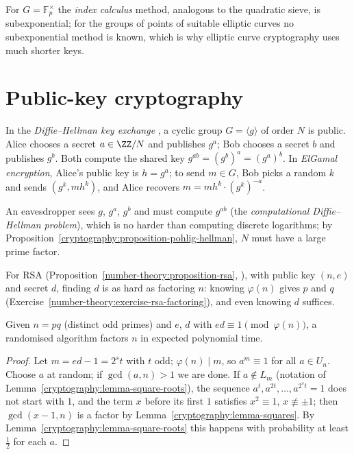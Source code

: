 For $G = \mathbb{F}_p^\times$ the \emph{index calculus} method, analogous to the quadratic sieve, is subexponential; for the groups of points of suitable elliptic curves no subexponential method is known,
which is why elliptic curve cryptography uses much shorter keys.

\section{Public-key cryptography}\label{cryptography:section-public-key}

\begin{definition}\label{cryptography:definition-diffie-hellman}
In the \emph{Diffie--Hellman key exchange} \cite{diffie-hellman-1976}, a cyclic group $G = \langle g\rangle$ of order $N$ is public. Alice chooses a secret $a \in \ZZ/N$ and publishes $g^a$; Bob chooses a secret $b$ and
publishes $g^b$. Both compute the shared key $g^{ab} = (g^b)^a = (g^a)^b$. In \emph{ElGamal encryption}, Alice's public key is $h = g^a$; to send $m \in G$, Bob picks a random $k$ and sends $(g^k, mh^k)$, and
Alice recovers $m = mh^k \cdot (g^k)^{-a}$.
\end{definition}

An eavesdropper sees $g$, $g^a$, $g^b$ and must compute $g^{ab}$ (the \emph{computational Diffie--Hellman problem}), which is no harder than computing discrete logarithms; by
Proposition~\ref{cryptography:proposition-pohlig-hellman}, $N$ must have a large prime factor.

For RSA (Proposition~\ref{number-theory:proposition-rsa}, \cite{rivest-shamir-adleman}), with public key $(n, e)$ and secret $d$, finding $d$ is as hard as factoring $n$: knowing $\varphi(n)$ gives $p$ and $q$
(Exercise~\ref{number-theory:exercise-rsa-factoring}), and even knowing $d$ suffices.

\begin{proposition}\label{cryptography:proposition-rsa-factoring}
Given $n = pq$ (distinct odd primes) and $e$, $d$ with $ed \equiv 1 \pmod{\varphi(n)}$, a randomised algorithm factors $n$ in expected polynomial time.
\end{proposition}

\begin{proof}
Let $m = ed - 1 = 2^st$ with $t$ odd; $\varphi(n) \mid m$, so $a^m \equiv 1$ for all $a \in U_n$. Choose $a$ at random; if $\gcd(a, n) > 1$ we are done. If $a \notin L_m$ (notation of
Lemma~\ref{cryptography:lemma-square-roots}), the sequence $a^t, a^{2t}, \dots, a^{2^st} = 1$ does not start with $1$, and the term $x$ before its first $1$ satisfies $x^2 \equiv 1$, $x \not\equiv \pm1$; then
$\gcd(x - 1, n)$ is a factor by Lemma~\ref{cryptography:lemma-squares}. By Lemma~\ref{cryptography:lemma-square-roots} this happens with probability at least $\frac12$ for each $a$.
\end{proof}

